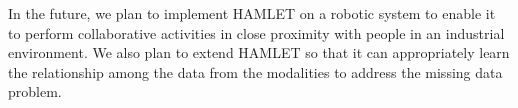 \documentclass[runningheads]{llncs}
\newcommand{\pa}{HAMLET}
\begin{document}
\par In the future, we plan to implement {\pa } on a robotic system to enable it to perform collaborative activities in close proximity with people in an industrial environment. We also plan to extend {\pa } so that it can appropriately learn the relationship among the data from the modalities to address the missing data problem.  \cite{keyless}



\end{document}
